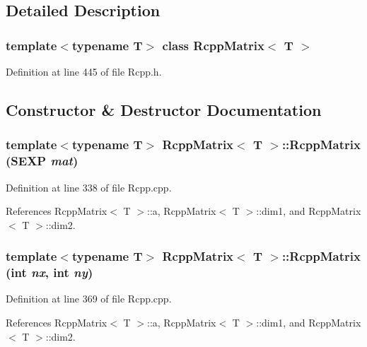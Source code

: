 \subsection{Detailed Description}
\subsubsection*{template$<$typename T$>$ class RcppMatrix$<$ T $>$}



Definition at line 445 of file Rcpp.h.

\subsection{Constructor \& Destructor Documentation}
\hypertarget{classRcppMatrix_6cdd09180c21b504d1455ae2bc8939a7}{
\subsubsection[RcppMatrix]{\setlength{\rightskip}{0pt plus 5cm}template$<$typename T$>$ {\bf RcppMatrix}$<$ T $>$::{\bf RcppMatrix} (SEXP {\em mat})}}
\label{classRcppMatrix_6cdd09180c21b504d1455ae2bc8939a7}




Definition at line 338 of file Rcpp.cpp.

References RcppMatrix$<$ T $>$::a, RcppMatrix$<$ T $>$::dim1, and RcppMatrix$<$ T $>$::dim2.\hypertarget{classRcppMatrix_9ac16e2fcccd2a21a33097139e4ec253}{
\subsubsection[RcppMatrix]{\setlength{\rightskip}{0pt plus 5cm}template$<$typename T$>$ {\bf RcppMatrix}$<$ T $>$::{\bf RcppMatrix} (int {\em nx}, \/  int {\em ny})}}
\label{classRcppMatrix_9ac16e2fcccd2a21a33097139e4ec253}




Definition at line 369 of file Rcpp.cpp.

References RcppMatrix$<$ T $>$::a, RcppMatrix$<$ T $>$::dim1, and RcppMatrix$<$ T $>$::dim2.

